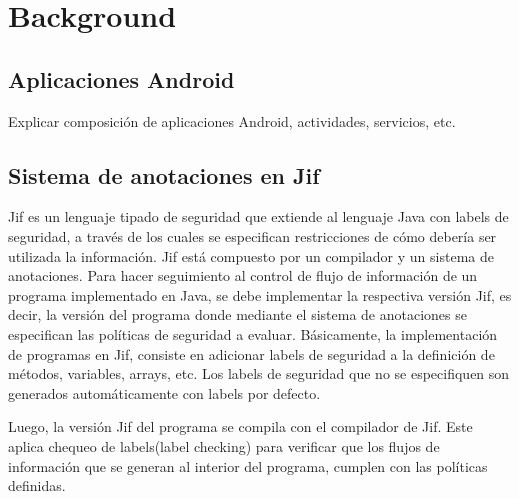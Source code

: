 \section{Background}
\label{sec:back}

\subsection{Aplicaciones Android}
Explicar composición de aplicaciones Android, actividades, servicios, etc.

\subsection{Sistema de anotaciones en Jif}
Jif es un lenguaje tipado de seguridad que extiende al lenguaje Java con labels
de seguridad, a través de los cuales se especifican restricciones de cómo
debería ser utilizada la información.\newline 
Jif está compuesto por un compilador y un sistema de anotaciones.\newline
Para hacer seguimiento al control de flujo de información de un programa
implementado en Java, se debe implementar la respectiva versión Jif, es decir,
la versión del programa donde mediante el sistema de anotaciones se especifican
las políticas de seguridad a evaluar.\newline
Básicamente, la implementación de programas en Jif, consiste en adicionar labels
de seguridad a la definición de métodos, variables, arrays, etc. Los labels de
seguridad que no se especifiquen son generados automáticamente con labels por
defecto.

Luego, la versión Jif del programa se compila con el compilador de Jif.
Este aplica chequeo de labels(label checking)\cite{jifRef} para verificar que
los flujos de información que se generan al interior del programa, cumplen con
las políticas definidas.

